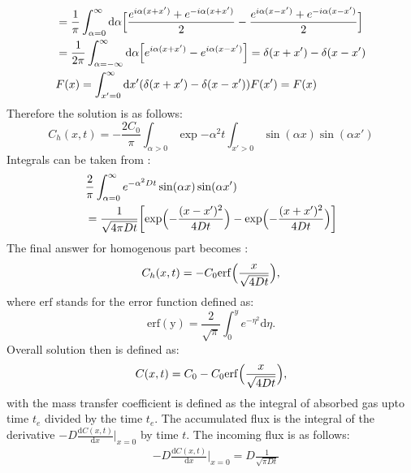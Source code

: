 \documentclass{article}
\begin{document}
\begin{description}
\begin{equation}
\begin{aligned}
&=\frac{1}{\pi}\int_{\alpha=0}^{\infty}{\mathrm{d}\alpha\Bigl[\frac{e^{i\alpha
(x+x')}+e^{-i\alpha(x+x')}}{2}-\frac{e^{i\alpha
(x-x')}+e^{-i\alpha(x-x')}}{2}\Bigr]}\\
&=\frac{1}{2\pi}\int_{\alpha=-\infty}^{\infty}{\mathrm{d}\alpha\Bigl[e^{i\alpha(x+x')}-e^{
i\alpha(x-x')} \Bigr]}=\delta(x+x')-\delta(x-x')\\
&F(x)=\int_{x'=0}^{\infty}{\mathrm{d} x' (\delta(x+x')-\delta(x-x')) F(x')}=F(x) 
\end{aligned}
\end{equation}
Therefore the solution is as follows:
\begin{equation}
C_h(x,t)=-\frac{2 C_0}{\pi}\int_{\alpha>0} {\exp{-\alpha^2 t} \int_{x'>0}{\sin(\alpha x) \sin(\alpha
x')}} 
\end{equation}
Integrals can be taken from \citet{ozisik}:
\begin{equation}
\begin{aligned}
&\frac{2}{\pi}\int_{\alpha=0}^{\infty}{e^{-\alpha^2 D t} \sin(\alpha x) \sin(\alpha
x')}\\
&=\frac{1}{\sqrt{4\pi D t}}\biggl[\exp\Bigl(-\frac{(x-x')^2}{4 D
t}\Bigr)-\exp\Bigl(-\frac{(x+x')^2}{4 D t}\Bigr)\biggr]
\end{aligned}
\end{equation}
The final answer for homogenous part becomes \cite{ozisik}:
\begin{equation}
C_h(x,t)=-C_0\mathrm{erf}\Bigl(\frac{x}{\sqrt{4 D t}}\Bigr),
\end{equation}
where $\mathrm{erf}$ stands for the error function defined as:
\begin{equation}
\mathrm{erf(y)}=\frac{2}{\sqrt{\pi}}\int_{0}^{y}{e^{-\eta^2}\mathrm{d}\eta}.
\end{equation}
Overall solution then is defined as:
\begin{equation}
C(x,t)=C_0-C_0\mathrm{erf}\Bigl(\frac{x}{\sqrt{4 D t}}\Bigr),
\end{equation}
with the mass transfer coefficient is defined as the integral of absorbed gas upto time $t_e$
divided by the time $t_e$. The accumulated  flux is the integral of the derivative
$-D\frac{\mathrm{d} C(x,t)}{\mathrm{d}x}|_{x=0}$ by time $t$. The incoming flux is as follows:
\begin{equation}
\begin{aligned}
&-D\frac{\mathrm{d} C(x,t)}{\mathrm{d}x}|_{x=0}=D \frac{1}{\sqrt{\pi D t}}\\
\end{aligned}

\end{equation}
\end{description}
\end{document}
